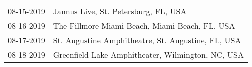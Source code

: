 \begin{supertabular}{ll}
 08-15-2019 &                Jannus Live, St. Petersburg, FL, USA \\
 08-16-2019 &      The Fillmore Miami Beach, Miami Beach, FL, USA \\
 08-17-2019 &  St. Augustine Amphitheatre, St. Augustine, FL, USA \\
 08-18-2019 &   Greenfield Lake Amphitheater, Wilmington, NC, USA \\
\end{supertabular}
